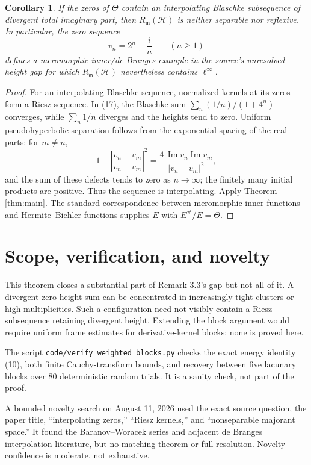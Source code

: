 \documentclass[11pt]{article}
\newtheorem{corollary}[theorem]{Corollary}
\newcommand{\Hc}{\mathcal H}
\newcommand{\Rm}{R_{\mathfrak m}}
\newcommand{\linf}{\ell^\infty}
\begin{document}
\begin{corollary}\label{cor:interp}
If the zeros of $\Theta$ contain an interpolating Blaschke subsequence of
divergent total imaginary part, then $\Rm(\Hc)$ is neither separable nor
reflexive.  In particular, the zero sequence
\[
 v_n=2^n+\frac{i}{n}\qquad(n\ge1)                          \tag{17}
\]
defines a meromorphic-inner/de Branges example in the source's unresolved
height gap for which $\Rm(\Hc)$ nevertheless contains $\linf$.
\end{corollary}

\begin{proof}
For an interpolating Blaschke sequence, normalized kernels at its zeros form
a Riesz sequence.  In (17), the Blaschke sum
$\sum_n (1/n)/(1+4^n)$ converges, while $\sum_n1/n$ diverges and the heights
tend to zero.  Uniform pseudohyperbolic separation follows from the
exponential spacing of the real parts: for $m\ne n$,
\[
 1-\left|\frac{v_n-v_m}{v_n-\bar v_m}\right|^2
 =\frac{4\,\operatorname{Im}v_n\operatorname{Im}v_m}
 {|v_n-\bar v_m|^2},
\]
and the sum of these defects tends to zero as $n\to\infty$; the finitely many
initial products are positive.  Thus the sequence is interpolating.  Apply
Theorem \ref{thm:main}.  The standard correspondence between meromorphic
inner functions and Hermite--Biehler functions supplies $E$ with
$E^\#/E=\Theta$.
\end{proof}

\section{Scope, verification, and novelty}

This theorem closes a substantial part of Remark 3.3's gap but not all of
it.  A divergent zero-height sum can be concentrated in increasingly tight
clusters or high multiplicities.  Such a configuration need not visibly
contain a Riesz subsequence retaining divergent height.  Extending the block
argument would require uniform frame estimates for derivative-kernel blocks;
none is proved here.

The script \texttt{code/verify\_weighted\_blocks.py} checks the exact energy
identity (10), both finite Cauchy-transform bounds, and recovery between five
lacunary blocks over 80 deterministic random trials.  It is a sanity check,
not part of the proof.

A bounded novelty search on August 11, 2026 used the exact source question,
the paper title, ``interpolating zeros,'' ``Riesz kernels,'' and
``nonseparable majorant space.''  It found the Baranov--Woracek series and
adjacent de Branges interpolation literature, but no matching theorem or full
resolution.  Novelty confidence is moderate, not exhaustive.
\end{document}
